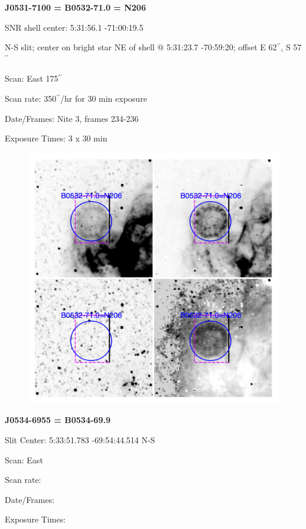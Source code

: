 \documentclass[11pt]{article}
\begin{document}
\newpage
{\bf J0531-7100 = B0532-71.0 = N206}  
 
SNR shell center:   5:31:56.1   -71:00:19.5   

N-S slit; center on bright star NE of shell @ 5:31:23.7  -70:59:20;  offset E 62$^{\prime\prime}$, S 57$^{\prime\prime}$

Scan:  East  175$^{\prime\prime}$

Scan rate:    350$^{\prime\prime}$/hr  for 30 min exposure

Date/Frames:   Nite 3, frames 234-236

Exposure Times:  3 x 30 min

\begin{figure}
\includegraphics[width=12.5cm]{snapshots/N206.png}
\end{figure}

\newpage
{\bf J0534-6955 = B0534-69.9}  
 
Slit Center:   5:33:51.783  -69:54:44.514  N-S

Scan:  East

Scan rate:  

Date/Frames:

Exposure Times:  
\end{document}
